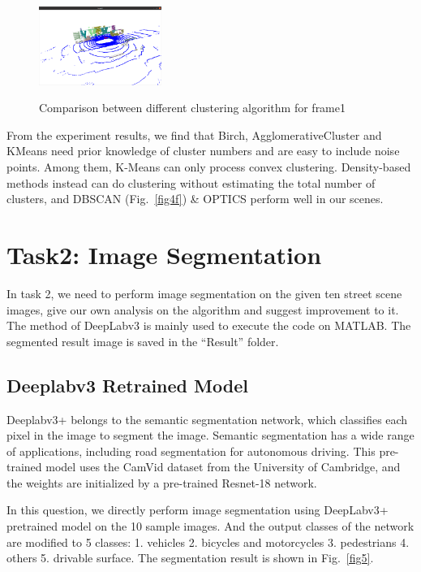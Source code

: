 \documentclass[8pt]{article}
\theoremstyle{nonumberplain}
\begin{document}
\begin{figure}[H]
\begin{minipage}[t]{0.3\textwidth}
		\label{fig4e}
	\end{minipage}
	\begin{minipage}[t]{0.3\textwidth}
		\centering
		\includegraphics[width=4cm]{fig3c.png}
		\label{fig4f}
	\end{minipage}
	\caption{Comparison between different clustering algorithm for frame1}
	\label{fig4}
\end{figure} 


From the experiment results, we find that Birch, AgglomerativeCluster and KMeans need prior knowledge of cluster numbers and are easy to include noise points. Among them, K-Means can only process convex clustering. Density-based methods instead can do clustering without estimating the total number of clusters, and DBSCAN (Fig.~\ref{fig4f}) \& OPTICS perform well in our scenes. 


\section{Task2: Image Segmentation}

\hspace{1.0em}
In task 2, we need to perform image segmentation on the given ten street scene images, give our own analysis on the algorithm and suggest improvement to it. The method of DeepLabv3 is mainly used to execute the code on MATLAB. The segmented result image is saved in the “Result” folder.

\subsection{Deeplabv3 Retrained Model}

\hspace{1.0em}
Deeplabv3+ belongs to the semantic segmentation network, which classifies each pixel in the image to segment the image. Semantic segmentation has a wide range of applications, including road segmentation for autonomous driving. This pre-trained model uses the CamVid dataset from the University of Cambridge, and the weights are initialized by a pre-trained Resnet-18 network.

In this question, we directly perform image segmentation using DeepLabv3+ pretrained model on the 10 sample images. And the output classes of the network are modified to 5 classes: 1. vehicles 2. bicycles and motorcycles 3. pedestrians 4. others 5. drivable surface. The segmentation result is shown in Fig.~\ref{fig5}. 
\end{document}
